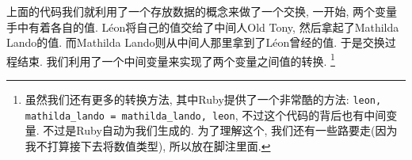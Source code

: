 上面的代码我们就利用了一个存放数据的概念来做了一个交换, 一开始, 两个变量手中有着各自的值. Léon将自己的值交给了中间人Old Tony, 然后拿起了Mathilda Lando的值. 而Mathilda Lando则从中间人那里拿到了Léon曾经的值. 于是交换过程结束. 我们利用了一个中间变量来实现了两个变量之间值的转换. \footnote{虽然我们还有更多的转换方法, 其中Ruby提供了一个非常酷的方法: \texttt{leon, mathilda_lando = mathilda_lando, leon}, 不过这个代码的背后也有中间变量. 不过是Ruby自动为我们生成的. 为了理解这个, 我们还有一些路要走(因为我不打算接下去将数值类型), 所以放在脚注里面. }

% 
% 
